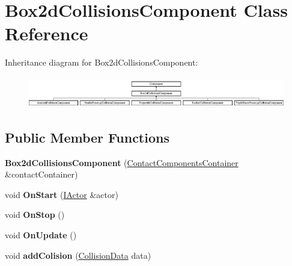\hypertarget{classBox2dCollisionsComponent}{}\section{Box2d\+Collisions\+Component Class Reference}
\label{classBox2dCollisionsComponent}
Inheritance diagram for Box2d\+Collisions\+Component\+:\begin{figure}[H]
\begin{center}
\leavevmode
\includegraphics[height=1.371429cm]{classBox2dCollisionsComponent}
\end{center}
\end{figure}
\subsection*{Public Member Functions}
\begin{DoxyCompactItemize}
\item 
{\bfseries Box2d\+Collisions\+Component} (\hyperlink{classContactComponentsContainer}{Contact\+Components\+Container} \&contact\+Container)\hypertarget{classBox2dCollisionsComponent_aa473347ad04a40bf29e72991da00fea4}{}\label{classBox2dCollisionsComponent_aa473347ad04a40bf29e72991da00fea4}

\item 
void {\bfseries On\+Start} (\hyperlink{classIActor}{I\+Actor} \&actor)\hypertarget{classBox2dCollisionsComponent_a6fe4bd1e26cc06369f0d167b64de1c05}{}\label{classBox2dCollisionsComponent_a6fe4bd1e26cc06369f0d167b64de1c05}

\item 
void {\bfseries On\+Stop} ()\hypertarget{classBox2dCollisionsComponent_ab54794a4252120907010ee9c5629faed}{}\label{classBox2dCollisionsComponent_ab54794a4252120907010ee9c5629faed}

\item 
void {\bfseries On\+Update} ()\hypertarget{classBox2dCollisionsComponent_a2e5ac66dfe25b7e02865114718114378}{}\label{classBox2dCollisionsComponent_a2e5ac66dfe25b7e02865114718114378}

\item 
void {\bfseries add\+Colision} (\hyperlink{structCollisionData}{Collision\+Data} data)\hypertarget{classBox2dCollisionsComponent_a93ca668f40bb24d58d9e22837cabcf48}{}\label{classBox2dCollisionsComponent_a93ca668f40bb24d58d9e22837cabcf48}

\end{DoxyCompactItemize}
